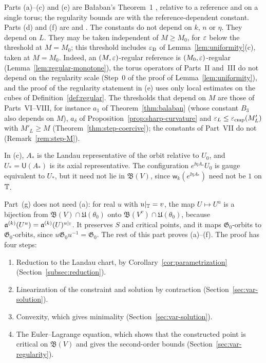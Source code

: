 Parts (a)--(c) and (e) are Ba\l aban's Theorem~1 \cite{BalVar}, relative to a reference and on a single torus; the regularity bounds are \cite[(9), (10)]{BalVar} with the reference-dependent constant. Parts (d) and (f) are \cite[(171), (178)]{BalVar} and \cite[Prop.~9, (190)]{BalVar}. The constants do not depend on $k$, $n$ or $\eta$. They depend on $L$. They may be taken independent of $M\ge M_0$, for $\varepsilon$ below the threshold at $M=M_0$; this threshold includes $\varepsilon_{\rm B}$ of Lemma~\ref{lem:uniformity}(c), taken at $M=M_0$. Indeed, an $(M,\varepsilon)$-regular reference is $(M_0,\varepsilon)$-regular (Lemma~\ref{lem:regular-monotone}), the torus operators of Parts~II and~III do not depend on the regularity scale (Step~0 of the proof of Lemma~\ref{lem:uniformity}), and the proof of the regularity statement in (e) uses only local estimates on the cubes of Definition~\ref{def:regular}. The thresholds that depend on $M$ are those of Parts~VI--VIII, for instance $a_1$ of Theorem~\ref{thm:balaban} (whose constant $B_3$ also depends on $M$), $a_\delta$ of Proposition~\ref{prop:sharp-curvature} and $\varepsilon_L\le\varepsilon_{\rm cmp}(M'_L)$ with $M'_L\ge M$ (Theorem~\ref{thm:step-coercive}); the constants of Part~VII do not (Remark~\ref{rem:step-M}).

In (c), $A_*$ is the Landau representative of the orbit relative to $U_0$, and $U_*=\mathsf U(A_*)$ is its axial representative. The configuration $e^{\ii\eta A_*}U_0$ is gauge equivalent to $U_*$, but it need not lie in $\mathfrak B(V)$, since $\mathsf w_k(e^{\ii\eta A_*})$ need not be $1$ on $\mathbb T$.

Part~(g) does not need (a): for real $u$ with $u|_\mathbb T=v$, the map $U\mapsto U^u$ is a bijection from $\mathfrak B(V)\cap\mathfrak U(\theta_0)$ onto $\mathfrak B(V^v)\cap\mathfrak U(\theta_0)$, because $\mathfrak a^{(k)}(U^u)=\mathfrak a^{(k)}(U)^{u|_\mathbb T}$. It preserves $S$ and critical points, and it maps $\mathfrak G_0$-orbits to $\mathfrak G_0$-orbits, since $u\mathfrak G_0u^{-1}=\mathfrak G_0$. The rest of this part proves (a)--(f). The proof has four steps:
\begin{enumerate}[label=\arabic*.]
\item Reduction to the Landau chart, by Corollary~\ref{cor:parametrization} (Section~\ref{subsec:reduction}).
\item Linearization of the constraint and solution by contraction (Section~\ref{sec:var-solution}).
\item Convexity, which gives minimality (Section~\ref{sec:var-solution}).
\item The Euler--Lagrange equation, which shows that the constructed point is critical on $\mathfrak B(V)$ and gives the second-order bounds (Section~\ref{sec:var-regularity}).
\end{enumerate}

